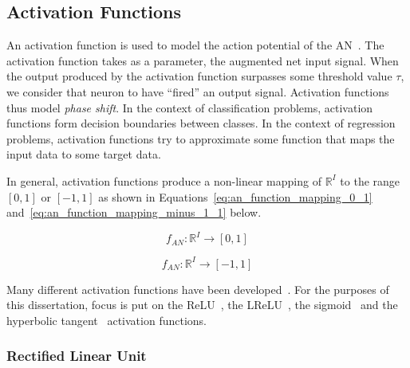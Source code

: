 \subsection{Activation Functions}\label{sec:anns:an:act_functions}

An activation function is used to model the action potential of the \acs{AN}~\cite{ref:ziv:1994, ref:hodgkin:1952}. The activation function takes as a parameter, the augmented net input signal. When the output produced by the activation function surpasses some threshold value $\tau$, we consider that neuron to have ``fired'' an output signal. Activation functions thus model \textit{phase shift}. In the context of classification problems, activation functions form decision boundaries between classes. In the context of regression problems, activation functions try to approximate some function that maps the input data to some target data.

In general, activation functions produce a non-linear mapping of $\mathbb{R}^{I}$ to the range $[0,1]$ or $[-1,1]$ as shown in Equations~\eqref{eq:an_function_mapping_0_1} and~\eqref{eq:an_function_mapping_minus_1_1} below.

\begin{equation}
      f_{AN}: \mathbb{R}^{I} \rightarrow [0,1]
      \label{eq:an_function_mapping_0_1}
\end{equation}

\begin{equation}
      f_{AN}: \mathbb{R}^{I} \rightarrow [-1,1]
      \label{eq:an_function_mapping_minus_1_1}
\end{equation}

\noindent
Many different activation functions have been developed~\cite{ref:karlik:2011}. For the purposes of this dissertation, focus is put on the \acf{ReLU}~\cite{ref:jarrett:2009, ref:nair:2010}, the \acf{LReLU}~\cite{ref:maas:2013}, the sigmoid~\cite{ref:lecun:1988} and the hyperbolic tangent~\cite{ref:lin:2008} activation functions.


\subsubsection{Rectified Linear Unit}\label{sec:anns:an:act_functions:relu}

